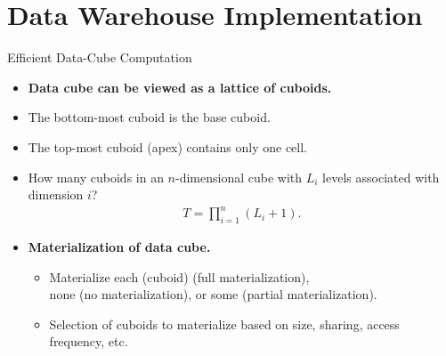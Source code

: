 \section{Data Warehouse Implementation}

\begin{frame}{Efficient Data-Cube Computation}
  \begin{itemize}
  \item \textbf{Data cube can be viewed as a lattice of cuboids.}
  \item The bottom-most cuboid is the base cuboid.
  \item The top-most cuboid (apex) contains only one cell.
  \item How many cuboids in an $n$-dimensional cube with $L_i$ levels associated with dimension $i$?
    \begin{align}
      T = \prod_{i=1}^{n} (L_i +1).
    \end{align}
  \item \textbf{{\color{airforceblue}Materialization} of data cube.}
    \begin{itemize}
    \item Materialize each (cuboid) (full materialization), \\
      none (no materialization), or some (partial materialization).
    \item Selection of cuboids to materialize based on size, sharing, access frequency, etc.
    \end{itemize}
  \end{itemize}
\end{frame}

